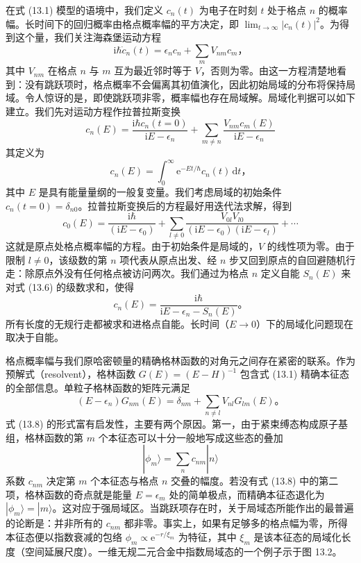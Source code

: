 在式 (13.1) 模型的语境中，我们定义 $c_{n}(t)$ 为电子在时刻 $t$ 处于格点 $n$ 的概率幅。长时间下的回归概率由格点概率幅的平方决定，即 $\lim_{t\to\infty}|c_{n}(t)|^{2}$。为得到这个量，我们关注海森堡运动方程
\begin{equation*}
\mathrm{i}\hbar\dot{c}_{n}(t)=\epsilon_{n}c_{n}+\sum_{m}V_{nm}c_{m}\text{，}\tag{13.3}
\end{equation*}
其中 $V_{nm}$ 在格点 $n$ 与 $m$ 互为最近邻时等于 $V$，否则为零。由这一方程清楚地看到：没有跳跃项时，格点概率不会偏离其初值演化，因此初始局域的分布将保持局域。令人惊讶的是，即使跳跃项非零，概率幅也存在局域解。局域化判据可以如下建立。我们先对运动方程作拉普拉斯变换
\begin{equation*}
c_{n}(E)=\frac{\mathrm{i}\hbar c_{n}(t=0)}{\mathrm{i}E-\epsilon_{n}}+\sum_{m\neq n}\frac{V_{nm}c_{m}(E)}{\mathrm{i}E-\epsilon_{n}}\tag{13.4}
\end{equation*}
其定义为
\begin{equation*}
c_{n}(E)=\int_{0}^{\infty}\mathrm{e}^{-Et/\hbar}c_{n}(t)\,\mathrm{d}t\text{，}\tag{13.5}
\end{equation*}
其中 $E$ 是具有能量量纲的一般复变量。我们考虑局域的初始条件 $c_{n}(t=0)=\delta_{n0}$。拉普拉斯变换后的方程最好用迭代法求解，得到
\begin{equation*}
c_{0}(E)=\frac{\mathrm{i}\hbar}{(\mathrm{i}E-\epsilon_{0})}+\sum_{l\neq 0}\frac{V_{0l}V_{l0}}{(\mathrm{i}E-\epsilon_{0})(\mathrm{i}E-\epsilon_{l})}+\cdots\tag{13.6}
\end{equation*}
这就是原点处格点概率幅的方程。由于初始条件是局域的，$V$ 的线性项为零。由于限制 $l\neq 0$，该级数的第 $n$ 项代表从原点出发、经 $n$ 步又回到原点的自回避随机行走：除原点外没有任何格点被访问两次。我们通过为格点 $n$ 定义自能 $S_{n}(E)$ 来对式 (13.6) 的级数求和，使得
\begin{equation*}
c_{n}(E)=\frac{\mathrm{i}\hbar}{\mathrm{i}E-\epsilon_{n}-S_{n}(E)}\text{。}\tag{13.7}
\end{equation*}
所有长度的无规行走都被求和进格点自能。长时间（$E\to 0$）下的局域化问题现在取决于自能。

格点概率幅与我们原哈密顿量的精确格林函数的对角元之间存在紧密的联系。作为预解式（resolvent），格林函数 $G(E)=(E-H)^{-1}$ 包含式 (13.1) 精确本征态的全部信息。单粒子格林函数的矩阵元满足
\begin{equation*}
(E-\epsilon_{n})G_{nm}(E)=\delta_{nm}+\sum_{n\neq l}V_{nl}G_{lm}(E)\text{。}\tag{13.8}
\end{equation*}
式 (13.8) 的形式富有启发性，主要有两个原因。第一，由于紧束缚态构成原子基组，格林函数的第 $m$ 个本征态可以十分一般地写成这些态的叠加
\begin{equation*}
|\phi_{m}\rangle=\sum_{n}c_{nm}|n\rangle\tag{13.9}
\end{equation*}
系数 $c_{nm}$ 决定第 $m$ 个本征态与格点 $n$ 交叠的幅度。若没有式 (13.8) 中的第二项，格林函数的奇点就是能量 $E=\epsilon_{m}$ 处的简单极点，而精确本征态退化为 $|\phi_{m}\rangle=|m\rangle$。这对应于强局域区。当跳跃项存在时，关于局域态所能作出的最普遍的论断是：并非所有的 $c_{nm}$ 都非零。事实上，如果有足够多的格点幅为零，所得本征态便以指数衰减的包络 $\phi_{m}\propto\mathrm{e}^{-r/\xi_{m}}$ 为特征，其中 $\xi_{m}$ 是该本征态的局域化长度（空间延展尺度）。一维无规二元合金中指数局域态的一个例子示于图 13.2。

